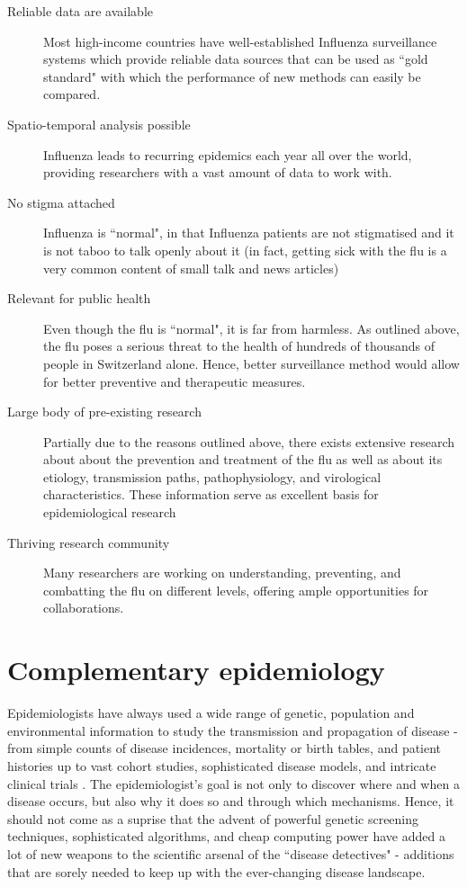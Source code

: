 \documentclass[11pt, a4paper,twoside]{report}\usepackage[]{graphicx}\usepackage[]{color}
\begin{document}
\begin{description}
\item [Reliable data are available] Most high-income countries have well-established Influenza surveillance systems which provide reliable data sources that can be used as ``gold standard" with which the performance of new methods can easily be compared.
\item [Spatio-temporal analysis possible] Influenza leads to recurring epidemics each year all over the world, providing researchers with a vast amount of data to work with.
\item [No stigma attached] Influenza is ``normal", in that Influenza patients are not stigmatised and it is not taboo to talk openly about it (in fact, getting sick with the flu is a very common content of small talk and news articles)
\item [Relevant for public health ] Even though the flu is ``normal", it is far from harmless. As outlined above, the flu poses a serious threat to the health of hundreds of thousands of people in Switzerland alone. Hence, better surveillance method would allow for better preventive and therapeutic measures.
\item [Large body of pre-existing research] Partially due to the reasons outlined above, there exists extensive research about about the prevention and treatment of the flu as well as about its etiology, transmission paths, pathophysiology, and virological characteristics. These information serve as excellent basis for epidemiological research
\item [Thriving research community] Many researchers are working on understanding, preventing, and combatting the flu on different levels, offering ample opportunities for collaborations.
\end{description}

\section{Complementary epidemiology}
Epidemiologists have always used a wide range of genetic, population and environmental information to study the transmission and propagation of disease - from simple counts of disease incidences, mortality or birth tables, and patient histories up to vast cohort studies, sophisticated disease models, and intricate clinical trials \citep{rothman2012epidemiology,koepsell2014epidemiologic}. The epidemiologist's goal is not only to discover where and when a disease occurs, but also why it does so and through which mechanisms. Hence, it should not come as a suprise that the advent of powerful genetic screening techniques, sophisticated algorithms, and cheap computing power have added a lot of new weapons to the scientific arsenal of the ``disease detectives" \citep{bailey2005introduction, khoury_transforming_2013, gardy_real-time_2015} - additions that are sorely needed to keep up with the ever-changing disease landscape.\newline
\end{document}
